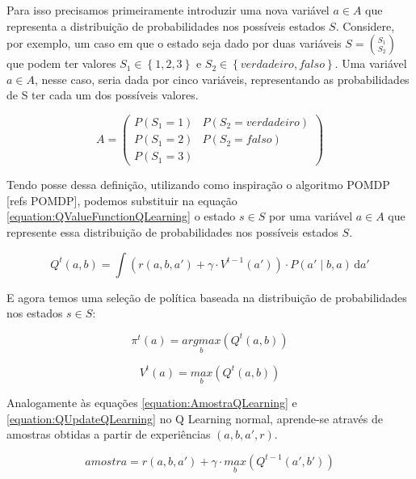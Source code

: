 Para isso precisamos primeiramente introduzir uma nova variável $ a \in A $ que representa a distribuição de probabilidades nos possíveis estados $ S $. Considere, por exemplo, um caso em que o estado seja dado por duas variáveis $ S = \binom{S_1}{S_2} $ que podem ter valores $ S_1 \in \left\{1,2,3\right\} $ e $ S_2 \in \left\{verdadeiro, falso\right\} $. Uma variável $ a \in A $, nesse caso, seria dada por cinco variáveis, representando as probabilidades de S ter cada um dos possíveis valores.

$$
	A = \left(
	\begin{matrix}
		P \left( S_1 = 1 \right) & P \left( S_2 = verdadeiro \right) \\
		P \left( S_1 = 2 \right) & P \left( S_2 = falso \right) \\
		P \left( S_1 = 3 \right) &  
	\end{matrix} \right)
$$

Tendo posse dessa definição, utilizando como inspiração o algoritmo POMDP [refs POMDP], podemos substituir na equação \ref{equation:QValueFunctionQLearning} o estado $ s \in S $ por uma variável $ a \in A $ que represente essa distribuição de probabilidades nos possíveis estados $ S $.

\begin{equation} \label{equation:QValueFunctionPartiallyObservable}
    Q^t \left( a, b \right) = \int \! \left( r \left( a, b, a' \right) + \gamma \cdot V^{t-1} \left( a' \right) \right) \cdot P \left( a' \mid b, a \right) \, \mathrm{d}a'
\end{equation}

E agora temos uma seleção de política baseada na distribuição de probabilidades nos estados $ s \in S $:

\begin{equation} \label{equation:PolicySelectionPartiallyObservable}
    \pi^t \left( a \right) = \underset{b}{argmax} \left( Q^t \left( a, b \right) \right)
\end{equation}

\begin{equation}
    V^t \left( a \right) = \underset{b}{max} \left( Q^t \left( a, b \right) \right)
\end{equation}


Analogamente às equações \ref{equation:AmostraQLearning} e \ref{equation:QUpdateQLearning} no Q Learning normal, aprende-se através de amostras obtidas a partir de experiências $ \left( a, b, a', r \right) $.


\begin{equation}
	amostra = r \left( a, b, a' \right) + \gamma \cdot \underset{b}{max} \left( Q^{t-1} \left( a', b' \right) \right)
\end{equation}

